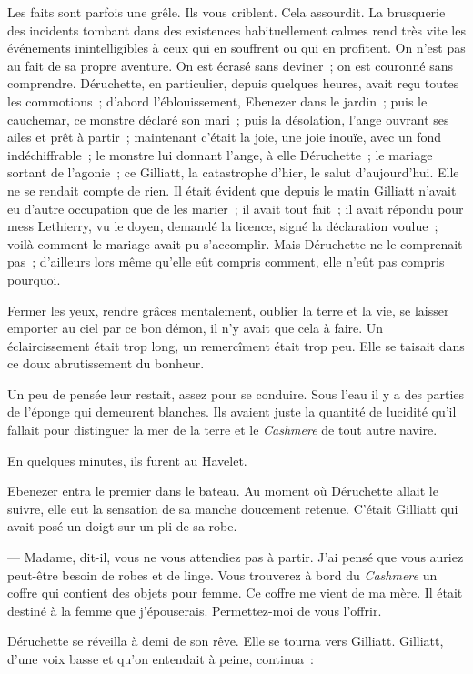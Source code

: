 \documentclass[french,twoside]{book} %
\begin{document}
Les faits sont parfois une grêle. Ils vous criblent. Cela assourdit. La brusquerie des incidents tombant dans des existences habituellement calmes rend très vite les événements inintelligibles à ceux qui en souffrent ou qui en profitent. On n’est pas au fait de sa propre aventure. On est écrasé sans deviner ; on est couronné sans comprendre. Déruchette, en particulier, depuis quelques heures, avait reçu toutes les commotions ; d’abord l’éblouissement, Ebenezer dans le jardin ; puis le cauchemar, ce monstre déclaré son mari ; puis la désolation, l’ange ouvrant ses ailes et prêt à partir ; maintenant c’était la joie, une joie inouïe, avec un fond indéchiffrable ; le monstre lui donnant l’ange, à elle Déruchette ; le mariage sortant de l’agonie ; ce Gilliatt, la catastrophe d’hier, le salut d’aujourd’hui. Elle ne se rendait compte de rien. Il était évident que  depuis le matin Gilliatt n’avait eu d’autre occupation que de les marier ; il avait tout fait ; il avait répondu pour mess Lethierry, vu le doyen, demandé la licence, signé la déclaration voulue ; voilà comment le mariage avait pu s’accomplir. Mais Déruchette ne le comprenait pas ; d’ailleurs lors même qu’elle eût compris comment, elle n’eût pas compris pourquoi.\par
Fermer les yeux, rendre grâces mentalement, oublier la terre et la vie, se laisser emporter au ciel par ce bon démon, il n’y avait que cela à faire. Un éclaircissement était trop long, un remercîment était trop peu. Elle se taisait dans ce doux abrutissement du bonheur.\par
Un peu de pensée leur restait, assez pour se conduire. Sous l’eau il y a des parties de l’éponge qui demeurent blanches. Ils avaient juste la quantité de lucidité qu’il fallait pour distinguer la mer de la terre et le \emph{Cashmere} de tout autre navire.\par
En quelques minutes, ils furent au Havelet.\par
Ebenezer entra le premier dans le bateau. Au moment où Déruchette allait le suivre, elle eut la sensation de sa manche doucement retenue. C’était Gilliatt qui avait posé un doigt sur un pli de sa robe.\par
— Madame, dit-il, vous ne vous attendiez pas à partir. J’ai pensé que vous auriez peut-être besoin de robes et de linge. Vous trouverez à bord du \emph{Cashmere }un coffre qui contient des objets pour femme. Ce coffre me vient de ma mère. Il était destiné à la femme que j’épouserais. Permettez-moi de vous l’offrir.\par
Déruchette se réveilla à demi de son rêve. Elle se  tourna vers Gilliatt. Gilliatt, d’une voix basse et qu’on entendait à peine, continua :\par
\end{document}

